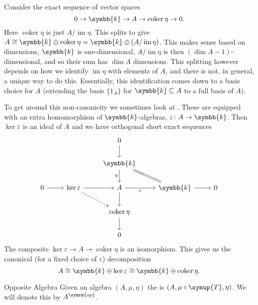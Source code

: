 \documentclass[fleqn]{NotesClass}
\newcommand{\switch}{\symup{T}}
\newcommand{\isomorphic}{\cong}
\renewcommand{\field}{\symbb{k}}
\newcommand{\op}{\symrm{op}}
\DeclareMathOperator{\im}{im}
\DeclareMathOperator{\coker}{coker}
\begin{document}
    Consider the exact sequence of vector spaces
    \begin{equation}
        0 \to \field \to A \to \coker \eta \to 0.
    \end{equation}
    Here \(\coker \eta\) is just \(A / \im \eta \).
    This splits to give \(A \isomorphic \field \oplus \coker \eta = \field \oplus (A / \im \eta)\).
    This makes sense based on dimensions, \(\field\) is one-dimensional, \(A/\im \eta\) is then \((\dim A - 1)\)-dimensional, and so their sum has \(\dim A\) dimensions.
    This splitting however depends on how we identify \(\im \eta\) with elements of \(A\), and there is not, in general, a unique way to do this.
    Essentially, this identification comes down to a basis choice for \(A\) (extending the basis \(\{1_A\}\) for \(\field \subseteq A\) to a full basis of \(A\)).
    
    To get around this non-canonicity we sometimes look at .
    These are equipped with an extra homomorphism of \(\field\)-algebras, \(\varepsilon \colon A \to \field\).
    Then \(\ker \varepsilon\) is an ideal of \(A\) and we have orthogonal short exact sequences
    \begin{equation}
        \begin{tikzcd}
            & & 0 \arrow[d]\\
            & & \field \arrow[d, "\eta"'] \arrow[dr, equal]\\
            0 \arrow[r] & \ker \varepsilon \arrow[r] \arrow[dr, dashed] & A \arrow[r, "\varepsilon"'] \arrow[d] & \field \arrow[r] & 0\\
            & & \coker \eta \arrow[d]\\
            & & 0
        \end{tikzcd}
    \end{equation}
    The composite \(\ker \varepsilon \to A \to \coker \eta\) is an isomorphism.
    This gives us the canonical (for a fixed choice of \(\varepsilon\)) decomposition
    \begin{equation}
        A \isomorphic \field \oplus \ker \varepsilon \isomorphic \field \oplus \coker \eta.
    \end{equation}
    
    \begin{dfn}{Opposite Algebra}{}
        Given an algebra \((A, \mu, \eta)\) the  is \((A, \mu \circ \switch, \eta)\).
        We will denote this by \(A^{\op}\).
    \end{dfn}
    
\end{document}
